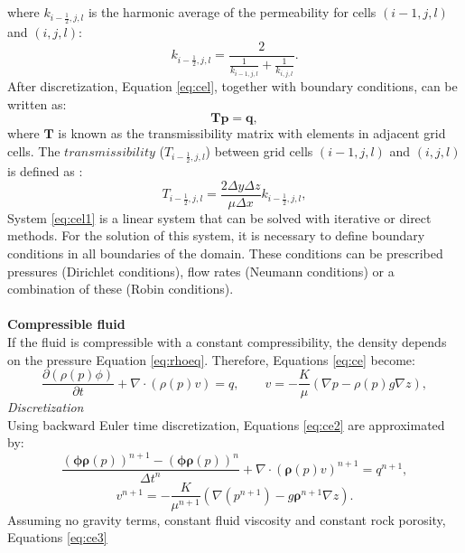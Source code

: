 \documentclass[review]{elsarticle}
\begin{document}
where $k_{i-\frac{1}{2},j,l}$ is the harmonic average of the permeability for cells 
$(i-1,j,l)$ and $(i,j,l)$:
\begin{equation}\label{eq:ha}
 k_{i-\frac{1}{2},j,l}=\frac{2}{\frac{1}{ k_{i-1,j,l}}+\frac{1}{ k_{i,j,l}}}.
\end{equation}
After discretization, Equation \eqref{eq:cel}, together with boundary conditions, can be written as:
 \begin{equation}\label{eq:cel1}
\mathbf{T}\mathbf{p} = \mathbf{q},
\end{equation}
where $\mathbf{T}$ is known as the transmissibility matrix with elements in adjacent grid cells. The $transmissibility$ ($T_{i-\frac{1}{2},j,l}$) between grid cells $(i-1,j,l)$ and $(i,j,l)$ is defined as \cite{Cordazzo02}:
\begin{equation}\label{eq:htrans}
 T_{i-\frac{1}{2},j,l}=\frac{2\Delta y \Delta z}{\mu\Delta x}k_{i-\frac{1}{2},j,l},
\end{equation} 
System \eqref{eq:cel1} is a linear system that can be solved with iterative or direct methods. For the solution of this system, it is necessary to define boundary conditions in all boundaries of the domain. These conditions can be prescribed pressures 
(Dirichlet conditions), flow rates (Neumann conditions) or a combination of these (Robin conditions).  \\\\
\textbf{Compressible fluid}\\
If the fluid is compressible with a constant compressibility, the density depends on the pressure Equation \eqref{eq:rhoeq}. Therefore, Equations \eqref{eq:ce} become:
\begin{equation}\label{eq:ce2}
\frac{\partial (\rho(p) \phi)}{\partial t}+ \nabla \cdot ( \rho(p) {v})=q, \qquad v=-\frac{K}{\mu}(\nabla p-\rho(p) g\nabla z),
\end{equation}
\emph{Discretization}\\
Using backward Euler time discretization, Equations \eqref{eq:ce2} are approximated by:
\begin{equation*}
 \frac{(\mathbf{\phi}\mathbf{\rho}(p))^{n+1}-(\mathbf{\phi}\mathbf{\rho}(p))^{n}}{\Delta t^n}
 +\nabla \cdot (\mathbf{\rho}({p}) v)^{n+1}={q}^{n+1},
\end{equation*}
\begin{equation}\label{eq:ce3}
{v}^{n+1}= -\frac{{K}}{\mu^{n+1}}(\nabla({p}^{n+1})-g\mathbf{\rho}^{n+1}\nabla{z}).
\end{equation}
Assuming no gravity terms, constant fluid viscosity and constant rock porosity, Equations \eqref{eq:ce3}
\end{document}
